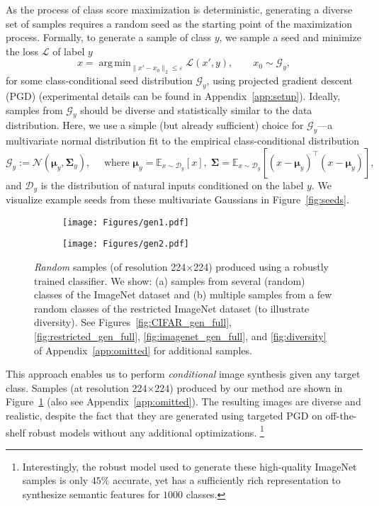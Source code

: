 \documentclass{article}
\DeclareMathOperator*{\argmin}{arg\,min}
\newcommand{\D}{\mathcal{D}}
\newcommand{\Gy}{\mathcal{G}_y}
\newcommand{\loss}{\mathcal{L}}
\newcommand{\eps}{\varepsilon}
\newcommand{\E}{\mathbb{E}}
\let\oldmu\mu
\let\oldsig\Sigma
\renewcommand{\mu}{\bm{\oldmu}}
\renewcommand{\Sigma}{\bm{\oldsig}}
\begin{document}
As the process of class score maximization is deterministic, generating a diverse set of samples requires a random
seed as the starting point of the maximization process. 
Formally, to generate a sample of class $y$, we sample a seed and minimize the
loss $\loss$ of label $y$
$$x = \argmin_{\|x' - x_0\|_2\leq\eps}\loss(x', y), \qquad x_0\sim \Gy,$$
 for some class-conditional seed distribution $\Gy$, using projected gradient descent (PGD)
(experimental details can be found in Appendix~\ref{app:setup}). 
Ideally, samples from $\Gy$ should be diverse and  
statistically similar to the data distribution. Here, we use 
a simple (but already sufficient) choice for $\Gy$---a multivariate normal
distribution fit to the empirical class-conditional distribution
$$\Gy := \mathcal{N}(\mu_y, \Sigma_y),\quad \text{ where }
    \mu_y = \E_{x\sim\D_y}[x], \; \Sigma = \E_{x\sim\D_y}[(x-\mu_y)^\top (x
    -\mu_y)],$$
and $\D_y$ is the distribution of natural inputs conditioned on the label
$y$.
We visualize example seeds from these multivariate Gaussians in
Figure~\ref{fig:seeds}.
\begin{figure}[!h]
    \begin{subfigure}[b]{1\textwidth}
	\texttt{[image: Figures/gen1.pdf]}
    \caption{}
    \end{subfigure}
    \begin{subfigure}[b]{1\textwidth}
	\texttt{[image: Figures/gen2.pdf]}
    \caption{}
	\end{subfigure}
    \caption{{\em Random} samples (of resolution 224$\times$224) produced using 
        a robustly trained classifier. We show: (a) samples from several (random) 
        classes of the ImageNet dataset and (b) multiple samples from a few
        random classes of the restricted ImageNet dataset (to illustrate
        diversity). See Figures~\ref{fig:CIFAR_gen_full},
        \ref{fig:restricted_gen_full}, \ref{fig:imagenet_gen_full}, 
        and \ref{fig:diversity} of Appendix~\ref{app:omitted} for additional 
        samples.}
	\label{fig:generation}
\end{figure}

This approach enables us to perform
\emph{conditional} image synthesis given any target class.
Samples (at resolution 224$\times$224) produced by our method are shown in 
Figure~\ref{fig:generation} (also see Appendix~\ref{app:omitted}).
The resulting images are diverse
and  realistic, despite the fact that they are
generated using targeted PGD on off-the-shelf
robust models without any additional optimizations.
\footnote{Interestingly, the robust model used to generate
these high-quality ImageNet samples is only $45\%$ 
accurate, yet has a sufficiently rich representation to synthesize 
semantic features for $1000$ classes.}
\end{document}
